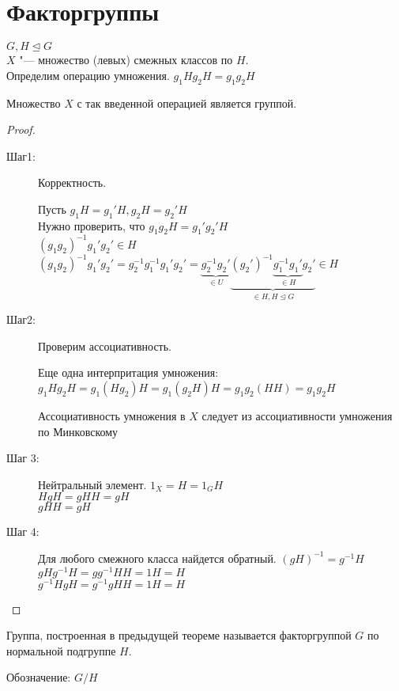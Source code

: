 ﻿\section{Факторгруппы}
$G, H \unlhd G$\\
$X$ "--- множество (левых) смежных классов по $H$.\\
Определим операцию умножения. 
$g_1H g_2H = g_1g_2H$
\begin{theorem}
Множество $X$ с так введенной операцией является группой. 
\end{theorem}
\begin{proof}
\begin{description}
\item[Шаг1:]
Корректность. 

Пусть $g_1H = g_1'H, g_2H = g_2'H$\\
Нужно проверить, что $g_1g_2H = g_1'g_2'H$\\

$(g_1g_2)^{-1}g_1'g_2' \in H$\\
$(g_1g_2)^{-1}g_1'g_2' = g_2^{-1}g_1^{-1}g_1'g_2' = \underbrace{g_2^{-1}g_2'}_{\in U} \underbrace{(g_2')^{-1} \underbrace{g_1^{-1}g_1'}_{\in H}g_2'}_{\in H, H \unlhd G} \in H$\\
\item [Шаг2:]
Проверим ассоциативность.

Еще одна интерпритация умножения:
$g_1Hg_2H = g_1(Hg_2)H = g_1(g_2H)H = g_1g_2(HH) = g_1g_2H$


Ассоциативность умножения в $X$ следует  из ассоциативности умножения по Минковскому\\
\item [Шаг 3:]
Нейтральный элемент. 
$1_X = H = 1_GH$\\
$HgH = gHH = gH$\\
$gHH = gH$\\
\item [Шаг 4:]
Для любого смежного класса найдется обратный. 
$(gH)^{-1} = g^{-1}H$\\
$gHg^{-1}H = gg^{-1}HH = 1H = H$\\
$g^{-1}HgH = g^{-1}gHH = 1H = H$\\
\end{description}
\end{proof}
\begin{Def}
Группа, построенная в предыдущей теореме называется факторгруппой $G$ по нормальной подгруппе $H$.

Обозначение: $G / H$\\
\end{Def}

